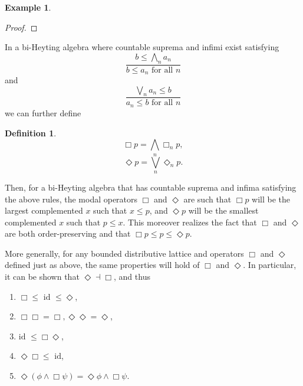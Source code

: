 \documentclass[11pt]{book}
\theoremstyle{definition}
\newtheorem{example}{Example}[section]
\theoremstyle{definition}
\newtheorem{definition}{Definition}[section]
\theoremstyle{definition}
\theoremstyle{theorem}
\theoremstyle{definition}
\begin{document}
\begin{example}
\begin{proof}
	\end{proof}
	In a bi-Heyting algebra where countable suprema and infimi exist satisfying 
	\begin{equation*}
	\frac{b \leq \bigwedge_n a_n}{b \leq a_n \text{ for all } n}
	\end{equation*}
	and 
	\begin{equation*}
	\frac{\bigvee_n a_n \leq b}{a_n \leq b \text{ for all } n}
	\end{equation*}
	we can further define 
	\begin{definition}
		\begin{equation}
		\Box p = \bigwedge_n \Box_n p, 
		\end{equation}
		\begin{equation}
		\Diamond p = \bigvee_n \Diamond_n p. 
		\end{equation}
	\end{definition} \par 
	Then, for a bi-Heyting algebra that has countable suprema and infima satisfying the above rules, the modal operators $\Box$ and $\Diamond$ are such that $\Box p$ will be the largest complemented $x$ such that $x \leq p$, and $\Diamond p$ will be the smallest complemented $x$ such that $p \leq x$. This moreover realizes the fact that $\Box$ and $\Diamond$ are both order-preserving and that $\Box p \leq p \leq \Diamond p$.\par 
	More generally, for any bounded distributive lattice and operators $\Box$ and $\Diamond$ defined just as above, the same properties will hold of $\Box$ and $\Diamond$. In particular, it can be shown that $\Diamond \dashv \Box$, and thus
	\label{5 inequalities}
	\begin{enumerate}
		\item $\Box \leq \text{ id } \leq \Diamond$,
		\item $\Box \Box  = \Box , \Diamond \Diamond = \Diamond$, 
		\item $\text{id } \leq \Box \Diamond$, 
		\item $\Diamond \Box \leq \text{ id}$,
		\item $\Diamond (\phi \wedge \Box \psi) = \Diamond \phi \wedge \Box \psi$. 
	\end{enumerate}

\end{example}
\end{document}
